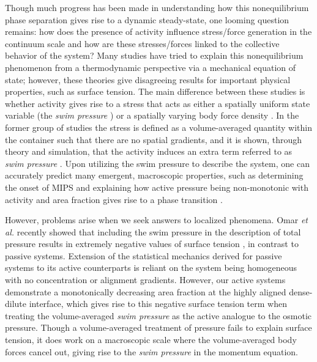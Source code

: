 \documentclass[twoside,twocolumn,9pt]{article}
\begin{document}
Though much progress has been made in understanding how this nonequilibrium phase separation gives rise to a dynamic steady-state, one looming question remains: how does the presence of activity influence stress/force generation in the continuum scale and how are these stresses/forces linked to the collective behavior of the system? Many studies have tried to explain this nonequilibrium phenomenon from a thermodynamic perspective via a mechanical equation of state; however, these theories give disagreeing results for important physical properties, such as surface tension.  The main difference between these studies is whether activity gives rise to a stress that acts as either a spatially uniform state variable (the \textit{swim pressure} \cite{Takatori2014a, Fily2014, Takatori2017, Mallory2020}) or a spatially varying body force density \cite{Epstein2019, Omar2020MicroscopicMatter}. In the former group of studies the stress is defined as a volume-averaged quantity within the container such that there are no spatial gradients, and it is shown, through theory and simulation, that the activity induces an extra term referred to as \emph{swim pressure} \cite{Takatori2014a}. Upon utilizing the swim pressure to describe the system, one can accurately predict many emergent, macroscopic properties, such as determining the onset of MIPS \cite{Winkler2015, Levis2017} and explaining how active pressure being non-monotonic with activity and area fraction gives rise to a phase transition \cite{Takatori2014a, Winkler2015, Levis2017} .

However, problems arise when we seek answers to localized phenomena.  Omar \textit{et al.} recently showed that 
including the swim pressure in the description of total pressure results in extremely negative values of surface tension \cite{Bialke2015a, MariniBettoloMarconi2015, Paliwal2017, Patch2018, Solon2018b}, in contrast to passive systems. Extension of the statistical mechanics derived for passive systems to its active counterparts is reliant on the system being homogeneous with no concentration or alignment gradients.   However, our active systems demonstrate a monotonically decreasing area fraction at the highly aligned dense-dilute interface, which gives rise to this negative surface tension term when treating the volume-averaged \textit{swim pressure} as the active analogue to the osmotic pressure. Though a volume-averaged treatment of pressure fails to explain surface tension, it does work on a macroscopic scale where the volume-averaged body forces cancel out, giving rise to the \textit{swim pressure} in the momentum equation. 
\end{document}
